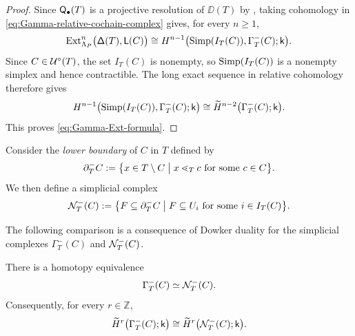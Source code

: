 \begin{proof}
Since $\mathsf Q_\bullet(T)$ is a projective resolution of $\DD(T)$ by
, taking cohomology in
\eqref{eq:Gamma-relative-cochain-complex} gives, for every $n\geq1$,
\[
\operatorname{Ext}_{\Lambda_P}^n\bigl(\mathsf\Delta(T),\mathsf L(C)\bigr)
\cong
H^{n-1}
\bigl(\operatorname{Simp}(I_T(C)),\Gamma_T^-(C);\mathsf{k}\bigr).
\]
Since $C\in\mathcal U^\circ(T)$, the set $I_T(C)$ is nonempty, so
$\operatorname{Simp}(I_T(C))$ is a nonempty simplex and hence contractible.
The long exact sequence in relative cohomology
\cite[Section~3.1]{Hatcher02} therefore gives
\[
H^{n-1}
\bigl(\operatorname{Simp}(I_T(C)),\Gamma_T^-(C);\mathsf{k}\bigr)
\cong
\widetilde H^{n-2}\bigl(\Gamma_T^-(C);\mathsf{k}\bigr).
\]
This proves \eqref{eq:Gamma-Ext-formula}.
\end{proof}



Consider the \emph{lower boundary} of $C$ in $T$ defined by 
\begin{equation}
\label{eq:lower-boundary}
\partial_T^-C
:=
\bigl\{
x\in T\setminus C
\bigm|
x\lessdot_T c
\text{ for some }c\in C
\bigr\}. 
\end{equation}
We then define a simplicial complex 
\begin{equation}
\label{eq:boundary-Dowker-complex}
\mathcal N_T^-(C)
:=
\bigl\{
F\subseteq\partial_T^-C
\bigm|
F\subseteq U_i
\text{ for some }i\in I_T(C)
\bigr\}.
\end{equation}


The following comparison is a consequence of Dowker duality \cite{Dowker52} for the
simplicial complexes $\Gamma_T^-(C)$ and $\mathcal N_T^-(C)$.

\begin{proposition}
\label{prop:Gamma-Dowker}
There is a homotopy equivalence
\[
\Gamma_T^-(C)\simeq\mathcal N_T^-(C).
\]
Consequently, for every $r\in\mathbb Z$,
\begin{equation}
\widetilde H^r\bigl(\Gamma_T^-(C);\mathsf{k}\bigr)
\cong
\widetilde H^r\bigl(\mathcal N_T^-(C);\mathsf{k}\bigr).
\label{eq:Gamma-boundary-cohomology}
\end{equation}
\end{proposition}


